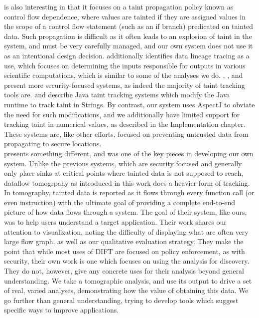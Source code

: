 \documentclass[msc,oneside]{ubcthesis}
\begin{document}
	\cite{Al-Saleh2010} is also interesting in that it focuses on a taint propagation policy known as control flow dependence, where values are tainted if they are assigned values in the scope of a control flow statement (such as an if branch) predicated on tainted data. Such propagation is difficult as it often leads to an explosion of taint in the system, and must be very carefully managed, and our own system does not use it as an intentional design decision. \cite{Gupta2008} additionally identifies data lineage tracing as a use, which focuses on determining the inputs responsible for outputs in various scientific computations, which is similar to some of the analyses we do. \cite{Dalton2010}, \cite{Zavou2011}, and \cite{Kangkook2012} present more security-focused systems, as indeed the majority of taint tracking tools are. \cite{Haldar2005} and \cite{Chin2009} describe Java taint tracking systems which modify the Java runtime to track taint in Strings. By contrast, our system uses AspectJ to obviate the need for such modifications, and we additionally have limited support for tracking taint in numerical values, as described in the Implementation chapter. These systems are, like other efforts, focused on preventing untrusted data from propagating to secure locations.\\
	
	\cite{Mysore2008} presents something different, and was one of the key pieces in developing our own system. Unlike the previous systems, which are security focused and generally only place sinks at critical points where tainted data is not supposed to reach, dataflow tomogrpahy as introduced in this work does a heavier form of tracking. In tomography, tainted data is reported as it flows through every function call (or even instruction) with the ultimate goal of providing a complete end-to-end picture of how data flows through a system. The goal of their system, like ours, was to help users understand a target application. Their work shares our attention to visualization, noting the difficulty of displaying what are often very large flow graph, as well as our qualitative evaluation strategy. They make the point that while most uses of DIFT are focused on policy enforcement, as with security, their own work is one which focuses on using the analysis for discovery. They do not, however, give any concrete uses for their analysis beyond general understanding. We take a tomographic analysis, and use its output to drive a set of real, varied analyses, demonstrating how the value of obtaining this data. We go further than general understanding, trying to develop tools which suggest specific ways to improve applications.
	
\end{document}
